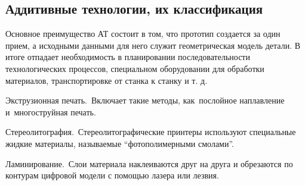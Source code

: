 \subsection{Аддитивные технологии, их классификация}

Основное преимущество АТ состоит в том, что прототип создается за один прием, а исходными данными для него служит геометрическая модель детали. В итоге отпадает необходимость в планировании последовательности технологических процессов, специальном оборудовании для обработки материалов, транспортировке от станка к станку и т. д.

Экструзионная печать. Включает такие методы, как послойное наплавление и многоструйная печать.

Стереолитография. Стереолитографические принтеры используют специальные жидкие материалы, называемые ``фотополимерными смолами''.

Ламинирование. Слои материала наклеиваются друг на друга и обрезаются по контурам цифровой модели с помощью лазера или лезвия. 
